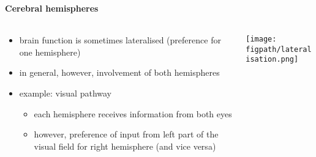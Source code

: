 \documentclass[8pt,t,usepdftitle=false]{beamer}
\def\figpath{\src/figures}
\begin{document}
\begin{frame}[plain]
  \frametitle{\ttl}
  \framesubtitle{Cerebral hemispheres}
  \begin{columns}
    \begin{column}{0.4\linewidth}
      \begin{itemize}\itemsep1ex
      \item brain function is sometimes lateralised (preference for one hemisphere)
      \item in general, however, involvement of both hemispheres
      \item<2-> example: visual pathway
        \begin{itemize}\itemsep1ex
        \item each hemisphere receives information from both eyes
        \item however, preference of input from left part of the visual 
        field for right hemisphere (and vice versa)
        \end{itemize}
      \end{itemize}      
    \end{column}
    \begin{column}{0.6\linewidth}
      \begin{center}
        \vspace*{-0.5cm}
        \parbox{\linewidth}{
          \texttt{[image: \\figpath/lateralisation.png]}
        }\\[1ex]
      \end{center}
    \end{column}
  \end{columns}
\end{frame}
\end{document}

